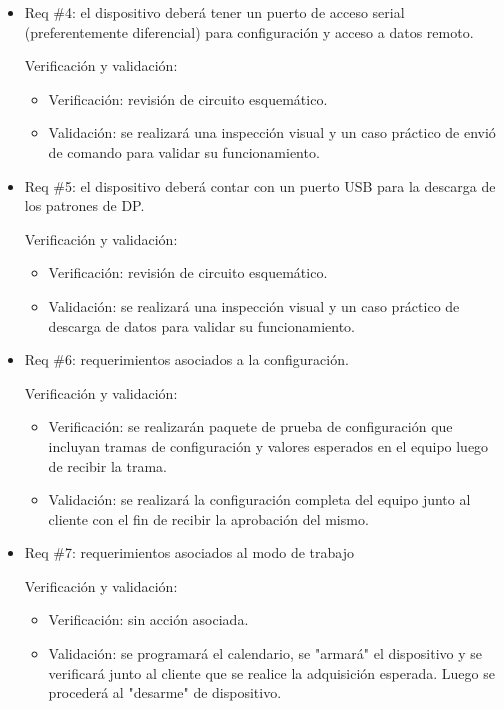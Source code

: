 \documentclass[11pt]{charter}
\begin{document}
\begin{itemize}
\item Req \#4: el dispositivo deberá tener un puerto de acceso serial (preferentemente diferencial) para configuración y acceso a datos remoto.

Verificación y validación:

\begin{itemize}
\item Verificación: revisión de circuito esquemático. 
\item Validación: se realizará una inspección visual y un caso práctico de envió de comando para validar su funcionamiento.
\end{itemize}

\item Req \#5: el dispositivo deberá contar con un puerto USB para la descarga de los patrones de DP.

Verificación y validación:

\begin{itemize}
\item Verificación: revisión de circuito esquemático.
\item Validación: se realizará una inspección visual y un caso práctico de descarga de datos para validar su funcionamiento.
\end{itemize}

\item Req \#6: requerimientos asociados a la configuración.

Verificación y validación:

\begin{itemize}
\item Verificación: se realizarán paquete de prueba de configuración que incluyan tramas de configuración y valores esperados en el equipo luego de recibir la trama.
\item Validación: se realizará la configuración completa del equipo junto al cliente con el fin de recibir la aprobación del mismo.
\end{itemize}

\item Req \#7: requerimientos asociados al modo de trabajo

Verificación y validación:

\begin{itemize}
\item Verificación: sin acción asociada.
\item Validación: se programará el calendario, se "armará" el dispositivo y se verificará junto al cliente que se realice la adquisición esperada. Luego se procederá al "desarme" de dispositivo.
\end{itemize}


\end{itemize}
\end{document}
